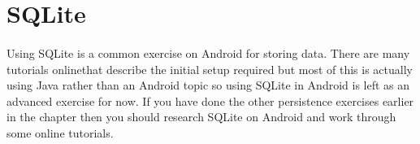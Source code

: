 \section{SQLite}
\paragraph{} Using SQLite is a common exercise on Android for storing data. There are many tutorials onlinethat describe the initial setup required but most of this is actually using Java rather than an Android topic so using SQLite in Android is left as an advanced exercise for now. If you have done the other persistence exercises earlier in the chapter then you should research SQLite on Android and work through some online tutorials.

